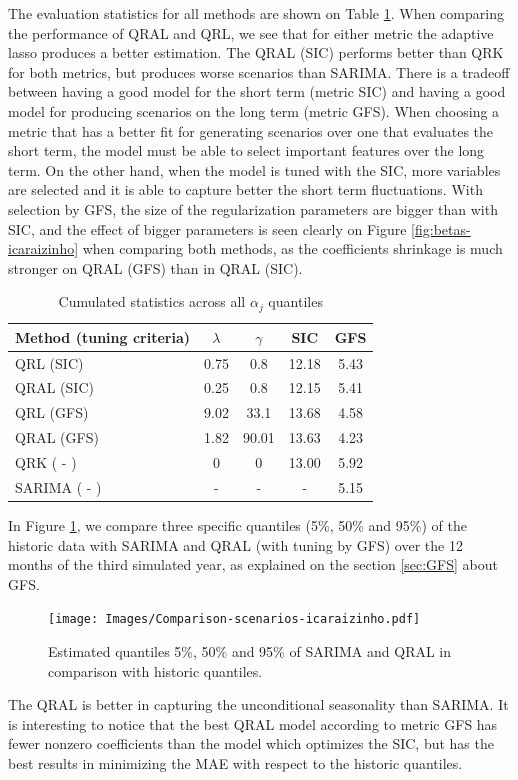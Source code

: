 The evaluation statistics for all methods are shown on Table \ref{tab:results-icaraizinho}. When comparing the performance  of QRAL and QRL, we see that for either metric the adaptive lasso produces a better estimation. 
The QRAL (SIC) performs better than QRK for both metrics, but produces worse scenarios than SARIMA. 
There is a tradeoff between having a good model for the short term (metric SIC) and having a good model for producing scenarios on the long term (metric GFS).
When choosing a metric that has a better fit for generating scenarios over one that evaluates the short term, the model must be able to select important features over the long term. On the other hand, when the model is tuned with the SIC, more variables are selected and it is able to capture better the short term fluctuations.
With selection by GFS, the size of the regularization parameters are bigger than with SIC, and the effect of bigger parameters is seen clearly on Figure \ref{fig:betas-icaraizinho} when comparing both methods, as the coefficients shrinkage is much stronger on QRAL (GFS) than in QRAL (SIC).
\begin{table}[h]
	\centering
	\caption{Cumulated statistics across all $\alpha_j$ quantiles}
	\label{tab:results-icaraizinho}
	\begin{tabular}{|l|c|c|c|c|}
		\hline 
		Method (tuning criteria) & $\lambda$ & $\gamma$ & SIC & GFS\tabularnewline
		\hline 
		\hline 
		QRL   (SIC) & 0.75 & 0.8 & 12.18 & 5.43\tabularnewline
		\hline 
		QRAL   (SIC) & 0.25 & 0.8 & 12.15 & 5.41\tabularnewline
		\hline 
		QRL    (GFS) & 9.02 & 33.1 & 13.68 & 4.58\tabularnewline
		\hline 
		QRAL   (GFS) & 1.82 & 90.01 & 13.63 & 4.23\tabularnewline
		\hline 
		QRK    ( - ) & 0 & 0 & 13.00 & 5.92 \tabularnewline
		\hline 
		SARIMA ( - ) & - & - & - & 5.15 \tabularnewline
		\hline 	
	\end{tabular}
	\end{table}
	


In Figure \ref{fig:simulated-quantiles}, we compare three specific quantiles (5\%, 50\% and 95\%) of the historic data with SARIMA and QRAL (with tuning by GFS) over the 12 months of the third simulated year, as explained on the section  \ref{sec:GFS} about GFS. 
\begin{figure}[h]
	\centering
	\texttt{[image: Images/Comparison-scenarios-icaraizinho.pdf]}
	\caption{Estimated quantiles 5\%, 50\% and 95\% of SARIMA and QRAL in comparison with historic quantiles.}
	\label{fig:simulated-quantiles}
\end{figure}
The QRAL is better in capturing the unconditional seasonality than SARIMA. It is interesting to notice that the best QRAL model according to metric GFS has fewer nonzero coefficients than the model which optimizes the SIC, but has the best results in minimizing the MAE with respect to the historic quantiles.  

